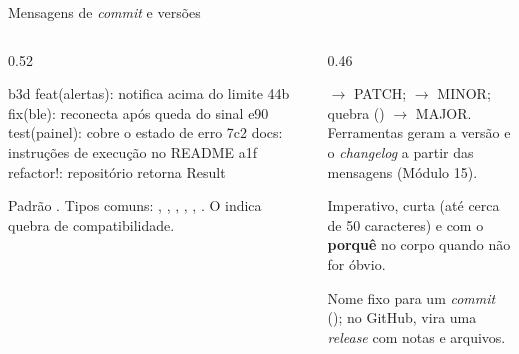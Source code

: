 \documentclass[aspectratio=169,10pt]{beamer}
\begin{document}
\begin{frame}[fragile]{Mensagens de \emph{commit} e versões}
  \begin{columns}[T]
    \begin{column}{0.52\textwidth}
\begin{terminal}[title=git log --oneline]
b3d feat(alertas): notifica acima do limite
44b fix(ble): reconecta após queda do sinal
e90 test(painel): cobre o estado de erro
7c2 docs: instruções de execução no README
a1f refactor!: repositório retorna Result
\end{terminal}
      \begin{definicao}
        Padrão . Tipos comuns: , , , , , . O \cod{!} indica quebra de compatibilidade.
      \end{definicao}
    \end{column}
    \begin{column}{0.46\textwidth}
      \begin{conceito}
         $\rightarrow$ PATCH;  $\rightarrow$ MINOR; quebra (\cod{!}) $\rightarrow$ MAJOR. Ferramentas geram a versão e o \emph{changelog} a partir das mensagens (Módulo 15).
      \end{conceito}
      \begin{dica}
        Imperativo, curta (até cerca de 50 caracteres) e com o \textbf{porquê} no corpo quando não for óbvio.
      \end{dica}
      \begin{definicao}[Tag]
        Nome fixo para um \emph{commit} (); no GitHub, vira uma \emph{release} com notas e arquivos.
      \end{definicao}
    \end{column}
  \end{columns}
\end{frame}
\end{document}
